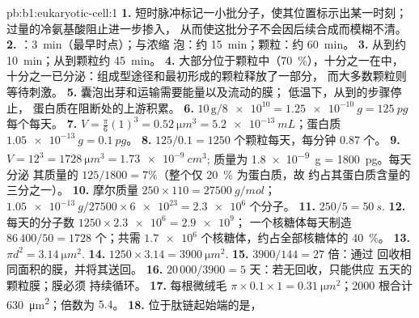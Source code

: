 \begin{solution}{pb:b1:eukaryotic-cell:1}
\textbf{1.} 短时脉冲标记一小批分子，使其位置标示出某一时刻；
过量的冷氨基酸阻止进一步掺入，
从而使这批分子不会因后续合成而模糊不清。
\textbf{2.} ：\qty{3}{min}（最早时点）；与浓缩
泡：约 \qty{15}{min}；颗粒：约 \qty{60}{min}。
\textbf{3.} 从到约 \qty{10}{min}；从到颗粒约
\qty{45}{min}。
\textbf{4.} 大部分位于颗粒中（\qty{70}{\%}），十分之一在中，
十分之一已分泌：组成型途径和最初形成的颗粒释放了一部分，
而大多数颗粒则等待刺激。
\textbf{5.} 囊泡出芽和运输需要能量以及流动的膜；
低温下，从到的步骤停止，
蛋白质在阻断处的上游积累。
\textbf{6.} $10\,\mathrm{g}/\num{8e10} = \qty{1.25e-10}{g} =
\qty{125}{pg}$ 每个每天。
\textbf{7.} $V = \frac{\pi}{6}(1)^3 = \qty{0.52}{\micro m^3} =
\qty{5.2e-13}{mL}$；蛋白质 $\qty{1.05e-13}{g} = \qty{0.1}{pg}$。
\textbf{8.} $125/0.1 = 1250$ 个颗粒每天，每分钟 $0.87$ 个。
\textbf{9.} $V = 12^3 = \qty{1728}{\micro m^3} = \qty{1.73e-9}{cm^3}$;
质量为 \qty{1.8e-9}{g} = \qty{1800}{pg}。每天分泌
其质量的 $125/1800 = 7\%$（整个仅 \qty{20}{\%} 为蛋白质，故
约占其蛋白质含量的三分之一）。
\textbf{10.} 摩尔质量 $250\times 110 = \qty{27500}{g/mol}$；
$\qty{1.05e-13}{g}/27500\times\num{6e23} = \num{2.3e6}$ 个分子。
\textbf{11.} $250/5 = \qty{50}{s}$.
\textbf{12.} 每天的分子数 $1250\times\num{2.3e6} = \num{2.9e9}$；
一个核糖体每天制造 $86\,400/50 = 1728$ 个；共需
$\num{1.7e6}$ 个核糖体，约占全部核糖体的 \qty{40}{\%}。
\textbf{13.} $\pi d^2 = \qty{3.14}{\micro m^2}$.
\textbf{14.} $1250\times 3.14 = \qty{3900}{\micro m^2}$.
\textbf{15.} $3900/144 = 27$ 倍：通过
回收相同面积的膜，并将其送回。
\textbf{16.} $20\,000/3900 = 5$ 天：若无回收，只能供应
五天的颗粒膜；膜必须
持续循环。
\textbf{17.} 每根微绒毛 $\pi\times 0.1\times 1 =
\qty{0.31}{\micro m^2}$；2000 根合计 \qty{630}{\micro m^2}；倍数为 $5.4$。
\textbf{18.} 位于肽链起始端的是，

\end{solution}
